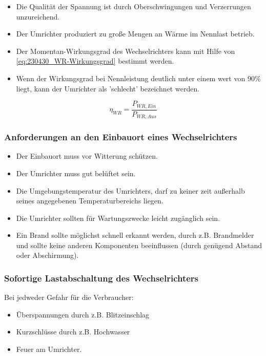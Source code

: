 \begin{itemize}
    \item Die Qualität der Spannung ist durch Oberschwingungen und Verzerrungen unzureichend.
    \item Der Umrichter produziert zu große Mengen an Wärme im Nennlast betrieb.
    \item Der Momentan-Wirkungsgrad des Wechselrichters kann mit Hilfe von \autoref{eq:230430_WR-Wirkungsgrad} bestimmt werden.
    \item Wenn der Wirkungsgrad bei Nennleistung deutlich unter einem wert von 90\% liegt, kann der Umrichter als 'schlecht' bezeichnet werden.
\end{itemize}

\begin{equation}
    \eta_{WR} = \frac{P_{WR,Ein}}{P_{WR,Aus}}
    \label{eq:230430_WR-Wirkungsgrad}
\end{equation}

\subsubsection{Anforderungen an den Einbauort eines Wechselrichters}
\begin{itemize}
    \item Der Einbauort muss vor Witterung schützen.
    \item Der Umrichter muss gut belüftet sein.
    \item Die Umgebungstemperatur des Umrichters, darf zu keiner zeit außerhalb seines angegebenen Temperaturbereichs liegen.
    \item Die Umrichter sollten für Wartungszwecke leicht zugänglich sein.
    \item Ein Brand sollte möglichst schnell erkannt werden, durch z.B. Brandmelder und sollte keine anderen Komponenten beeinflussen (durch genügend Abstand oder Abschirmung).
\end{itemize}
\subsubsection{Sofortige Lastabschaltung des Wechselrichters}
Bei jedweder Gefahr für die Verbraucher:
\begin{itemize}
    \item Überspannungen durch z.B. Blitzeinschlag
    \item Kurzschlüsse durch z.B. Hochwasser
    \item Feuer am Umrichter.
\end{itemize}
